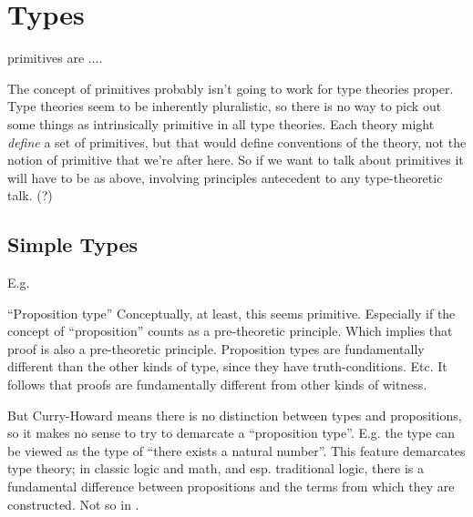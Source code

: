\chapter{\HoTT{} Types}
\label{subs:hott}

\HoTT{} primitives are ....

\begin{ednote}
  The concept of primitives probably isn't going to work for type
  theories proper.  Type theories seem to be inherently pluralistic,
  so there is no way to pick out some things as intrinsically
  primitive in all type theories.  Each theory might \emph{define} a
  set of primitives, but that would define conventions of the theory,
  not the notion of primitive that we're after here.  So if we want to
  talk about primitives it will have to be as above, involving
  principles antecedent to any type-theoretic talk. (?)
\end{ednote}

\section{Simple Types}
\label{subs:simpletypes}

\begin{ednote}
  E.g. \N
\end{ednote}

``Proposition type'' Conceptually, at least, this seems primitive.
Especially if the concept of ``proposition'' counts as a pre-theoretic
principle.  Which implies that proof is also a pre-theoretic
principle.  Proposition types are fundamentally different than the
other kinds of type, since they have
truth-conditions. Etc.  It follows that proofs are
fundamentally different from other kinds of witness.

\begin{ednote}
  But Curry-Howard means there is no distinction between types and
  propositions, so it makes no sense to try to demarcate a
  ``proposition type''.  E.g. the type \N can be viewed as the type of
  ``there exists a natural number''.  This feature demarcates type
  theory; in classic logic and math, and esp. traditional logic, there
  is a fundamental difference between propositions and the terms from
  which they are constructed.  Not so in \tth{}.
\end{ednote}


